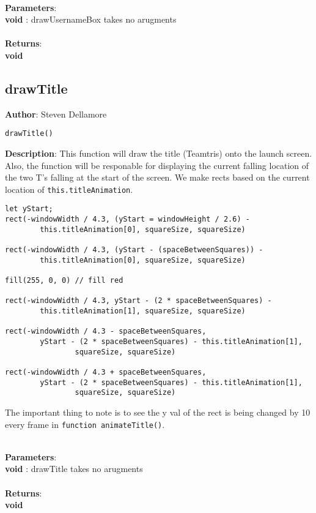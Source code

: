\documentclass[12pt]{article}
\begin{document}
\textbf{\large{\\Parameters}}:\\
\textbf{void }: drawUsernameBox takes no arugments\\\textbf{\large{\\Returns}}:\\\textbf{void}

\subsection{drawTitle}
\textbf{Author}: Steven Dellamore 
\vspace*{1\baselineskip}
\begin{lstlisting}
drawTitle()
\end{lstlisting} 
\vspace*{1\baselineskip}
\textbf{Description}: This function will draw the title (Teamtris) onto the launch screen. Also, the function will be responable for displaying the current falling location of the two T's falling at the start of the screen. We make rects based on the current location of \texttt{this.titleAnimation}. 
\begin{verbatim}
let yStart;
rect(-windowWidth / 4.3, (yStart = windowHeight / 2.6) - 
		this.titleAnimation[0], squareSize, squareSize) 

rect(-windowWidth / 4.3, (yStart - (spaceBetweenSquares)) - 
		this.titleAnimation[0], squareSize, squareSize) 

fill(255, 0, 0) // fill red

rect(-windowWidth / 4.3, yStart - (2 * spaceBetweenSquares) - 
		this.titleAnimation[1], squareSize, squareSize)

rect(-windowWidth / 4.3 - spaceBetweenSquares, 
		yStart - (2 * spaceBetweenSquares) - this.titleAnimation[1], 
				squareSize, squareSize)

rect(-windowWidth / 4.3 + spaceBetweenSquares, 
		yStart - (2 * spaceBetweenSquares) - this.titleAnimation[1], 
				squareSize, squareSize)
\end{verbatim}
 The important thing to note is to see the y val of the rect is being changed by 10 every frame in \texttt{function animateTitle()}. 


\textbf{\large{\\Parameters}}:\\
\textbf{void }: drawTitle takes no arugments\\\textbf{\large{\\Returns}}:\\\textbf{void}
\end{document}

